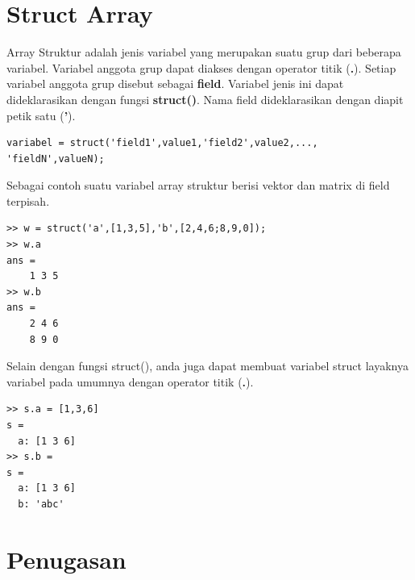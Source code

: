 \documentclass[12pt]{book}
\begin{document}
	\section{Struct Array}

	Array Struktur adalah jenis variabel yang merupakan suatu grup dari beberapa variabel.
	Variabel anggota grup dapat diakses dengan operator titik (\textbf{.}).
	Setiap variabel anggota grup disebut sebagai \textbf{field}.
	Variabel jenis ini dapat dideklarasikan dengan fungsi \textbf{struct()}.
	Nama field dideklarasikan dengan diapit petik satu (\textbf{'}).
	\begin{verbatim}
variabel = struct('field1',value1,'field2',value2,..., 'fieldN',valueN);
	\end{verbatim}

	Sebagai contoh suatu variabel array struktur berisi vektor dan matrix di field terpisah.
	\begin{verbatim}
>> w = struct('a',[1,3,5],'b',[2,4,6;8,9,0]);
>> w.a
ans =
    1 3 5
>> w.b
ans =
    2 4 6
    8 9 0
	\end{verbatim}

	\newpage
	Selain dengan fungsi struct(), anda juga dapat membuat variabel struct layaknya variabel pada umumnya dengan operator titik (\textbf{.}).
	\begin{verbatim}
>> s.a = [1,3,6]
s =
  a: [1 3 6]
>> s.b =
s =
  a: [1 3 6]
  b: 'abc'
	\end{verbatim}

	\newpage
	\section{Penugasan}
\end{document}
